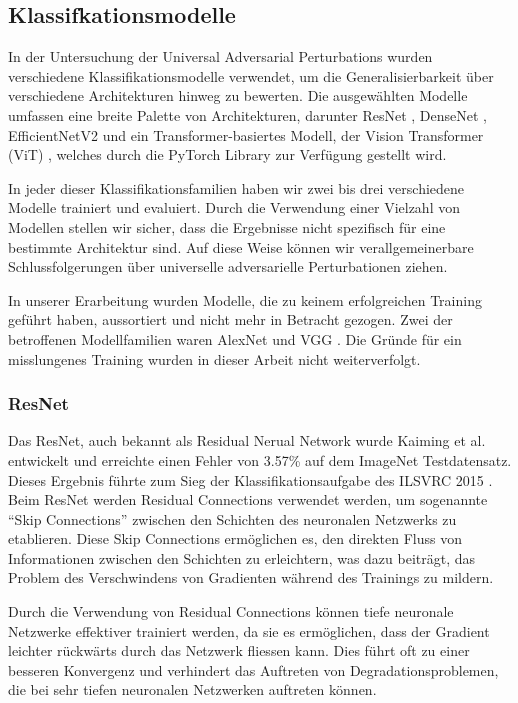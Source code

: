 \subsection{Klassifkationsmodelle}

In der Untersuchung der Universal Adversarial Perturbations wurden verschiedene Klassifikationsmodelle verwendet, um die Generalisierbarkeit über verschiedene Architekturen hinweg zu bewerten. Die ausgewählten Modelle umfassen eine breite Palette von Architekturen, darunter ResNet \cite{he_deep_2015}, DenseNet \cite{huang_densely_2018}, EfficientNetV2 \cite{tan_efficientnetv2_2021} und ein Transformer-basiertes Modell, der Vision Transformer (ViT) \cite{dosovitskiy_image_2021}, welches durch die PyTorch Library zur Verfügung gestellt wird.

In jeder dieser Klassifikationsfamilien haben wir zwei bis drei verschiedene Modelle trainiert und evaluiert. Durch die Verwendung einer Vielzahl von Modellen stellen wir sicher, dass die Ergebnisse nicht spezifisch für eine bestimmte Architektur sind. Auf diese Weise können wir verallgemeinerbare Schlussfolgerungen über universelle adversarielle Perturbationen ziehen.

In unserer Erarbeitung wurden Modelle, die zu keinem erfolgreichen Training geführt haben, aussortiert und nicht mehr in Betracht gezogen. Zwei der betroffenen Modellfamilien waren AlexNet \cite{krizhevsky_imagenet_2012} und VGG \cite{simonyan_very_2015}. Die Gründe für ein misslungenes Training wurden in dieser Arbeit nicht weiterverfolgt.


\subsubsection{ResNet}
Das ResNet, auch bekannt als Residual Nerual Network wurde Kaiming et al. \cite{he_deep_2015} entwickelt und erreichte einen Fehler von 3.57\% auf dem ImageNet Testdatensatz. Dieses Ergebnis führte zum Sieg der Klassifikationsaufgabe des ILSVRC 2015 . Beim ResNet werden Residual Connections verwendet werden, um sogenannte "`Skip Connections"' zwischen den Schichten des neuronalen Netzwerks zu etablieren. Diese Skip Connections ermöglichen es, den direkten Fluss von Informationen zwischen den Schichten zu erleichtern, was dazu beiträgt, das Problem des Verschwindens von Gradienten während des Trainings zu mildern.

Durch die Verwendung von Residual Connections können tiefe neuronale Netzwerke effektiver trainiert werden, da sie es ermöglichen, dass der Gradient leichter rückwärts durch das Netzwerk fliessen kann. Dies führt oft zu einer besseren Konvergenz und verhindert das Auftreten von Degradationsproblemen, die bei sehr tiefen neuronalen Netzwerken auftreten können.

